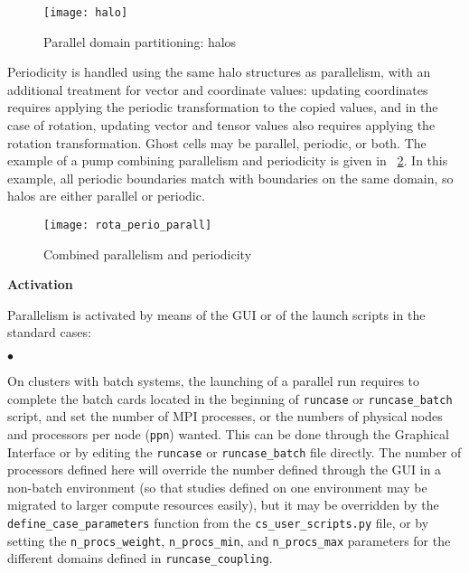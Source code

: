 {{{{\begin{figure}[!h]
\centerline{
\texttt{[image: halo]}}
\caption{Parallel domain partitioning: halos}\label{fig:haluile}
\end{figure}

Periodicity is handled using the same halo structures as parallelism,
with an additional treatment for vector and coordinate values: updating
coordinates requires applying the periodic transformation to the copied
values, and in the case of rotation, updating vector and tensor values
also requires applying the rotation transformation.
Ghost cells may be parallel, periodic, or both. The example of a pump
combining parallelism and periodicity is given in \figurename~\ref{fig:parperio_pump}.
In this example, all periodic boundaries match with boundaries on
the same domain, so halos are either parallel or periodic.

\begin{figure}[!h]
\centerline{
\texttt{[image: rota\_perio\_parall]}}
\caption{Combined parallelism and periodicity}\label{fig:parperio_pump}
\end{figure}

\label{prg_paralperio}
{\bf Activation}

Parallelism is activated by means of the GUI or of the launch scripts
in the standard cases:
\begin{list}{$\bullet$}{}

\item On clusters with batch systems, the launching of a parallel run
      requires to complete the batch cards located in the
      beginning of \texttt{runcase} or \texttt{runcase\_batch}
      script, and set the number of MPI processes, or the numbers
      of physical nodes and processors per node (\texttt{ppn}) wanted.
      This can be done through the Graphical Interface or by editing
      the \texttt{runcase}  or \texttt{runcase\_batch} file directly.
      The number of processors defined here will override the number
      defined through the GUI in a non-batch environment
      (so that studies defined on one environment may be migrated
      to larger compute resources easily), but it may be overridden
      by the \texttt{define\_case\_parameters} function from
      the \texttt{cs\_user\_scripts.py} file, or by setting the
      \texttt{n\_procs\_weight}, \texttt{n\_procs\_min}, and
      \texttt{n\_procs\_max} parameters for the different domains
      defined in \texttt{runcase\_coupling}.


\end{list}}}}}
